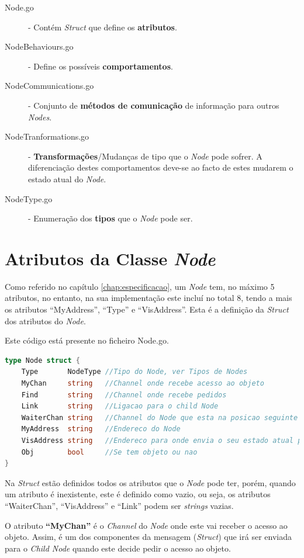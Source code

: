 \begin{description}
    \item [Node.go] - Contém \emph{Struct} que define os \textbf{atributos}.
    \item [NodeBehaviours.go] - Define os possíveis \textbf{comportamentos}.
    \item [NodeCommunications.go] - Conjunto de \textbf{métodos de comunicação} de informação para outros \emph{Nodes}.
    \item [NodeTranformations.go] - \textbf{Transformações}/Mudanças de tipo que o \emph{Node} pode sofrer. A diferenciação destes comportamentos deve-se ao facto de estes mudarem o estado atual do \emph{Node}.
    \item [NodeType.go] - Enumeração dos \textbf{tipos} que o \emph{Node} pode ser.
\end{description} 


\section{Atributos da Classe \emph{Node}}
\label{implementacao:sec:atributos_class}
Como referido no capítulo \ref{chap:especificacao}, um \emph{Node} tem, no máximo 5 atributos, no entanto, na sua implementação este incluí no total 8, tendo a mais os atributos ``MyAddress'', ``Type'' e ``VisAddress''.
Esta é a definição da \emph{Struct} dos atributos do \emph{Node}.


Este código está presente no ficheiro Node.go.


\begin{lstlisting}[caption={Definição da estrutura \emph{Node}},language=Go]
type Node struct {
	Type       NodeType //Tipo do Node, ver Tipos de Nodes
	MyChan     string   //Channel onde recebe acesso ao objeto
	Find       string   //Channel onde recebe pedidos
	Link       string   //Ligacao para o child Node
	WaiterChan string   //Channel do Node que esta na posicao seguinte da fila
	MyAddress  string   //Endereco do Node
	VisAddress string   //Endereco para onde envia o seu estado atual para a atualizacao da visualizacao
	Obj        bool     //Se tem objeto ou nao 
}

\end{lstlisting}
Na \emph{Struct} estão definidos todos os atributos que o \emph{Node} pode ter, porém, quando um atributo é inexistente, este é definido como vazio, ou seja, os atributos ``WaiterChan'', ``VisAddress'' e ``Link'' podem ser \emph{strings} vazias.

O atributo \textbf{``MyChan''} é o \emph{Channel} do \emph{Node} onde este vai receber o acesso ao objeto.
Assim, é um dos componentes da mensagem (\emph{Struct}) que irá ser enviada para o \emph{Child Node} quando este decide pedir o acesso ao objeto.

